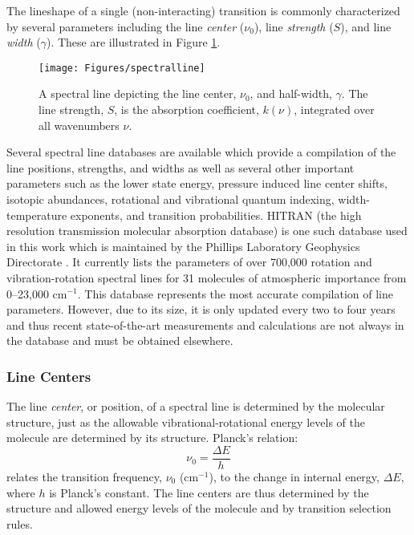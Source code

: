\documentclass[11pt]{article}
\begin{document}
The lineshape of a single (non-interacting) transition is commonly 
characterized by several parameters including the line {\it center} 
($\nu_0$), 
line {\it strength} ($S$), and line {\it width} ($\gamma$).  These are
illustrated in Figure \ref{fig:spectralline}.
\begin{figure}
  \begin{center}
  \texttt{[image: Figures/spectralline]}
  \end{center}
  \caption[A spectral line depicting the line center and line width.]
	{A spectral line depicting the line center, $\nu_0$, and half-width,
	$\gamma$.  The line strength, $S$, is the absorption coefficient,
	$k(\nu)$, integrated over all wavenumbers $\nu$.}
  \label{fig:spectralline}
\end{figure}

Several spectral line databases are available which provide a compilation
of the line positions, strengths, and widths as well as several other
important parameters such as the lower state energy, pressure induced line
center shifts, isotopic abundances, rotational and vibrational quantum
indexing, width-temperature exponents, and transition probabilities.
HITRAN\cite{rot:87,rot:92} 
(the high resolution transmission molecular absorption database) 
is one such database used in this work which is maintained by the Phillips 
Laboratory Geophysics Directorate .  It currently lists the
parameters of over 700,000 rotation and vibration-rotation spectral lines
for 31 molecules of atmospheric importance from 0--23,000 cm$^{-1}$.
This database represents the most accurate compilation of line parameters.
However, due to its size, it is only updated every two to four years and 
thus recent
state-of-the-art measurements and calculations are not always in the
database and must be obtained elsewhere.

\subsubsection{Line Centers}

The line {\it center}, or position, of a spectral line is determined by the
molecular structure, just as the allowable vibrational-rotational energy
levels of the molecule are determined by its structure.  Planck's relation: 
\begin{equation}
\nu_{0}=\frac{\Delta E}{h}
\end{equation}
relates the transition frequency, $\nu_{0}$ (cm$^{-1}$), to the 
change in internal energy, $\Delta E$, where $h$ is Planck's constant.  
The line centers are thus determined by the structure and allowed energy
levels of the molecule and by transition selection rules. 
\end{document}
